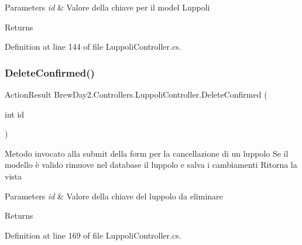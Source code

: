 \begin{DoxyParams}{Parameters}
{\em id} & Valore della chiave per il model Luppoli\\
\hline
\end{DoxyParams}
\begin{DoxyReturn}{Returns}

\end{DoxyReturn}


Definition at line 144 of file Luppoli\+Controller.\+cs.

\mbox{\label{class_brew_day2_1_1_controllers_1_1_luppoli_controller_ae44c16148ec11a6c09de346eb22242bf}} 
\subsubsection{\texorpdfstring{Delete\+Confirmed()}{DeleteConfirmed()}}
{\footnotesize\ttfamily Action\+Result Brew\+Day2.\+Controllers.\+Luppoli\+Controller.\+Delete\+Confirmed (\begin{DoxyParamCaption}\item[{int}]{id }\end{DoxyParamCaption})}



Metodo invocato alla submit della form per la cancellazione di un luppolo Se il modello è valido rimuove nel database il luppolo e salva i cambiamenti Ritorna la vista 


\begin{DoxyParams}{Parameters}
{\em id} & Valore della chiave del luppolo da eliminare\\
\hline
\end{DoxyParams}
\begin{DoxyReturn}{Returns}

\end{DoxyReturn}


Definition at line 169 of file Luppoli\+Controller.\+cs.

\mbox{\label{class_brew_day2_1_1_controllers_1_1_luppoli_controller_a18d3d1c67b44d7e1dca624e8a4e24f99}} 
